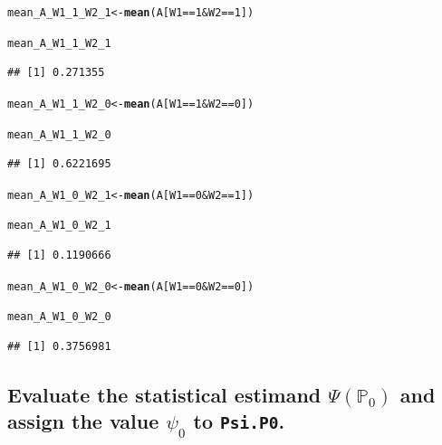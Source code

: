 \documentclass{article}\usepackage[]{graphicx}\usepackage[]{xcolor}
\makeatletter
\newcommand{\hlnum}[1]{\textcolor[rgb]{0.686,0.059,0.569}{#1}}%
\newcommand{\hlopt}[1]{\textcolor[rgb]{0,0,0}{#1}}%
\newcommand{\hlstd}[1]{\textcolor[rgb]{0.345,0.345,0.345}{#1}}%
\newcommand{\hlkwb}[1]{\textcolor[rgb]{0.69,0.353,0.396}{#1}}%
\newcommand{\hlkwd}[1]{\textcolor[rgb]{0.737,0.353,0.396}{\textbf{#1}}}%
\newenvironment{kframe}{%
 \def\at@end@of@kframe{}%
 \ifinner\ifhmode%
  \def\at@end@of@kframe{\end{minipage}}%
  \begin{minipage}{\columnwidth}%
 \fi\fi%
 \def\FrameCommand##1{\hskip\@totalleftmargin \hskip-\fboxsep
 \colorbox{shadecolor}{##1}\hskip-\fboxsep
     \hskip-\linewidth \hskip-\@totalleftmargin \hskip\columnwidth}%
 \MakeFramed {\advance\hsize-\width
   \@totalleftmargin\z@ \linewidth\hsize
   \@setminipage}}%
 {\par\unskip\endMakeFramed%
 \at@end@of@kframe}
\newenvironment{knitrout}{}{} %
\makeatother
\begin{document}
\begin{knitrout}
\color{fgcolor}\begin{kframe}
\begin{alltt}
\hlstd{mean_A_W1_1_W2_1} \hlkwb{<-} \hlkwd{mean}\hlstd{(A[W1} \hlopt{==} \hlnum{1} \hlopt{&} \hlstd{W2} \hlopt{==} \hlnum{1}\hlstd{])}

\hlstd{mean_A_W1_1_W2_1}
\end{alltt}
\begin{verbatim}
## [1] 0.271355
\end{verbatim}
\begin{alltt}
\hlstd{mean_A_W1_1_W2_0} \hlkwb{<-} \hlkwd{mean}\hlstd{(A[W1} \hlopt{==} \hlnum{1} \hlopt{&} \hlstd{W2} \hlopt{==} \hlnum{0}\hlstd{])}

\hlstd{mean_A_W1_1_W2_0}
\end{alltt}
\begin{verbatim}
## [1] 0.6221695
\end{verbatim}
\begin{alltt}
\hlstd{mean_A_W1_0_W2_1} \hlkwb{<-} \hlkwd{mean}\hlstd{(A[W1} \hlopt{==} \hlnum{0} \hlopt{&} \hlstd{W2} \hlopt{==} \hlnum{1}\hlstd{])}

\hlstd{mean_A_W1_0_W2_1}
\end{alltt}
\begin{verbatim}
## [1] 0.1190666
\end{verbatim}
\begin{alltt}
\hlstd{mean_A_W1_0_W2_0} \hlkwb{<-} \hlkwd{mean}\hlstd{(A[W1} \hlopt{==} \hlnum{0} \hlopt{&} \hlstd{W2} \hlopt{==} \hlnum{0}\hlstd{])}

\hlstd{mean_A_W1_0_W2_0}
\end{alltt}
\begin{verbatim}
## [1] 0.3756981
\end{verbatim}
\end{kframe}
\end{knitrout}
  
  \subsection{Evaluate the statistical estimand $\Psi(\mathbb{P}_0)$ and assign the value $\psi_0$ to \texttt{Psi.P0}.}
\end{document}
